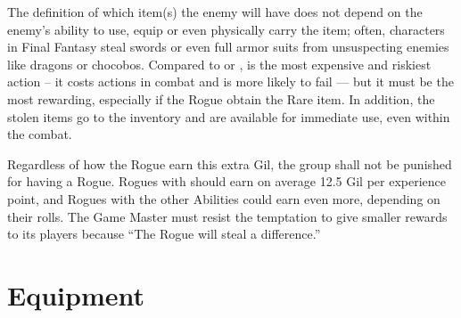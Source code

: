 \begin{multicols}{2}
The definition of which item(s) the enemy will have does not depend on the enemy's ability to use, equip or even physically carry the item; often, characters in Final Fantasy steal swords or even full armor suits from unsuspecting enemies like dragons or chocobos. Compared to  or ,  is the most expensive and riskiest action – it costs actions in combat and is more likely to fail --- but it must be the most rewarding, especially if the Rogue obtain the Rare item. In addition, the stolen items go to the inventory and are available for immediate use, even within the combat. %

Regardless of how the Rogue earn this extra Gil, the group shall not be punished for having a Rogue. Rogues with  should earn on average 12.5 Gil per experience point, and Rogues with the other Abilities could earn even more, depending on their rolls. The Game Master must resist the temptation to give smaller rewards to its players because “The Rogue will steal a difference.”
\end{multicols}
\clearpage

\section{Equipment}\label{sec:inv-equip}

